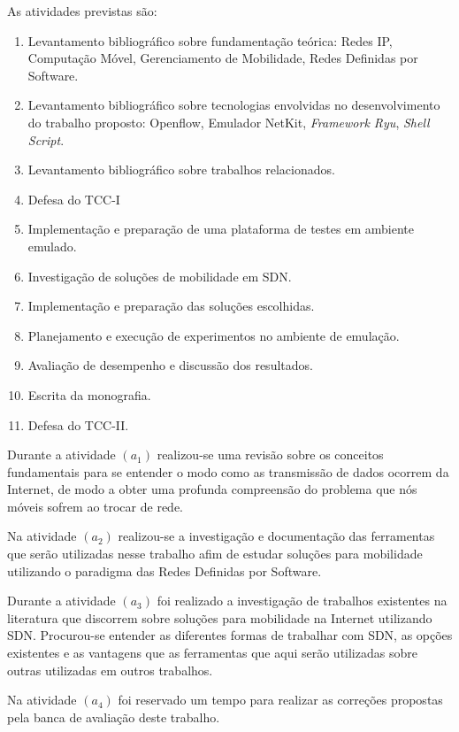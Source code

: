 \documentclass[	12pt, Times, openright, twoside, a4paper, english, brazil]{abntex2}
\begin{document}
As atividades previstas são:

\begin{enumerate}[label=$(a_{\arabic*})$]
 \item  Levantamento bibliográfico sobre fundamentação teórica: Redes IP, Computação Móvel, Gerenciamento de Mobilidade, Redes Definidas por Software.
 \item  Levantamento bibliográfico sobre tecnologias envolvidas no desenvolvimento do trabalho proposto: Openflow, Emulador NetKit, \textit{Framework Ryu}, \textit{Shell Script}.
 \item  Levantamento bibliográfico sobre trabalhos relacionados.
 \item  Defesa do TCC-I
 \item  Implementação e preparação de uma plataforma de testes em ambiente emulado.
 \item  Investigação de soluções de mobilidade em SDN.
 \item  Implementação e preparação das soluções escolhidas.
 \item  Planejamento e execução de experimentos no ambiente de emulação.
 \item  Avaliação de desempenho e discussão dos resultados.
 \item  Escrita da monografia.
 \item  Defesa do TCC-II.
\end{enumerate}

Durante a atividade $(a_1)$ realizou-se uma revisão sobre os conceitos fundamentais para se entender o modo como as transmissão de dados ocorrem da Internet, de modo a obter uma profunda compreensão do problema que nós móveis sofrem ao trocar de rede.

Na atividade $(a_2)$ realizou-se a investigação e documentação das ferramentas que serão utilizadas nesse trabalho afim de estudar soluções para mobilidade utilizando o paradigma das Redes Definidas por Software.

Durante a atividade $(a_3)$ foi realizado a investigação de trabalhos existentes na literatura que discorrem sobre soluções para mobilidade na Internet utilizando SDN. Procurou-se entender as diferentes formas de trabalhar com SDN, as opções existentes e as vantagens que as ferramentas que aqui serão utilizadas sobre outras utilizadas em outros trabalhos.

Na atividade $(a_4)$ foi reservado um tempo para realizar as correções propostas pela banca de avaliação deste trabalho.
\end{document}
